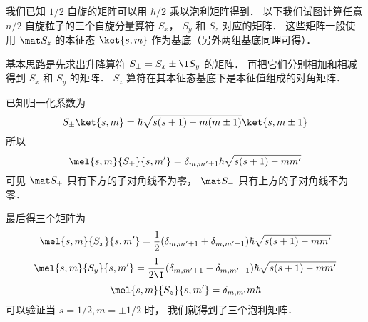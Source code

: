

我们已知 $1/2$ 自旋的矩阵可以用 $\hbar/2$ 乘以泡利矩阵得到． 以下我们试图计算任意 $n/2$ 自旋粒子的三个自旋分量算符 $S_x$， $S_y$ 和 $S_z$ 对应的矩阵． 这些矩阵一般使用 $\mat S_z$ 的本征态 $\ket{s, m}$ 作为基底（另外两组基底同理可得）．

基本思路是先求出升降算符 $S_\pm = S_x \pm \I S_y$ 的矩阵． 再把它们分别相加和相减得到 $S_x$ 和 $S_y$ 的矩阵． $S_z$ 算符在其本征态基底下是本征值组成的对角矩阵．

已知归一化系数为
\begin{equation}
S_\pm \ket{s,m} = \hbar \sqrt{s(s + 1) - m(m \pm 1)} \ket{s,m\pm1}
\end{equation}
所以
\begin{equation}
\mel{s,m}{S_\pm}{s,m'} = \delta_{m, m'\pm1} \hbar \sqrt{s(s + 1) - mm'}
\end{equation}
可见 $\mat S_+$ 只有下方的子对角线不为零， $\mat S_-$ 只有上方的子对角线不为零．

最后得三个矩阵为
\begin{equation}
\mel{s,m}{S_x}{s,m'} = \frac12(\delta_{m, m'+1} + \delta_{m, m'-1})\hbar \sqrt{s(s + 1) - mm'} 
\end{equation}
\begin{equation}
\mel{s,m}{S_y}{s,m'} = \frac{1}{2\I}(\delta_{m, m'+1} - \delta_{m, m'-1}) \hbar \sqrt{s(s + 1) - mm'}
\end{equation}
\begin{equation}
\mel{s,m}{S_z}{s,m'} = \delta_{m,m'} m\hbar 
\end{equation}
可以验证当 $s = 1/2, m = \pm1/2$ 时， 我们就得到了三个泡利矩阵．
